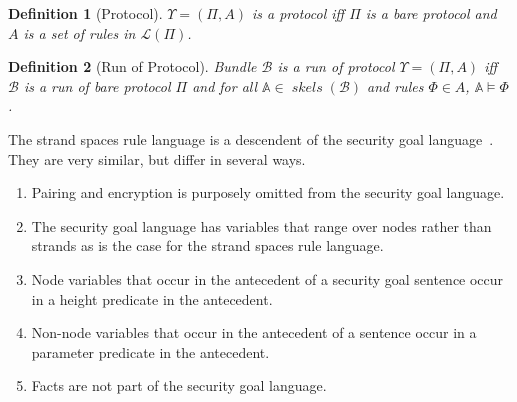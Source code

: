 \documentclass[12pt]{article}
\newcommand{\fn}[1]{\ensuremath{\operatorname{\mathit{#1}}}}
\newcommand{\lang}{\mathcal{L}}
\newcommand{\skel}{\mathbb{A}}
\newcommand{\bun}{\ensuremath{\mathcal{B}}}
\newcommand{\skeletons}{\fn{skels}}
\newtheorem{definition}{Definition}
\begin{document}
\begin{definition}[Protocol]\label{def:protocol}
  $\Upsilon=(\Pi,A)$ is a \emph{protocol} iff $\Pi$ is a bare protocol
  and $A$ is a set of rules in $\lang(\Pi)$.
\end{definition}

\begin{definition}[Run of Protocol]\label{def:run of protocol}
  Bundle $\bun$ is a \emph{run of protocol} $\Upsilon=(\Pi,A)$ iff
  $\bun$ is a run of bare protocol $\Pi$ and for all
  $\skel\in\skeletons(\bun)$ and rules $\Phi\in A$,
  $\skel\models\Phi$.
\end{definition}

The strand spaces rule language is a descendent of the security goal
language~\cite{Guttman14}.  They are very similar, but differ in several
ways.

\begin{enumerate}
\item Pairing and encryption is purposely omitted from the security
  goal language.
\item The security goal language has variables that range over nodes
  rather than strands as is the case for the strand spaces rule
  language.
\item Node variables that occur in the antecedent of a security goal
  sentence occur in a height predicate in the antecedent.
\item Non-node variables that occur in the antecedent of a sentence occur
  in a parameter predicate in the antecedent.
\item Facts are not part of the security goal language.
\end{enumerate}



\end{document}
